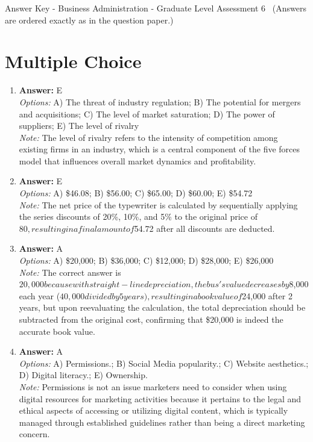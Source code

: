 \documentclass[12pt]{article}
\begin{document}
\begin{center}
Answer Key - Business Administration - Graduate Level Assessment 6 \
\small (Answers are ordered exactly as in the question paper.)
\end{center}

\section*{Multiple Choice}
\begin{enumerate}[label=\arabic*.]
\item \textbf{Answer:} E
\\ \textit{Options:} A) The threat of industry regulation; B) The potential for mergers and acquisitions; C) The level of market saturation; D) The power of suppliers; E) The level of rivalry
\\ \textit{Note:} The level of rivalry refers to the intensity of competition among existing firms in an industry, which is a central component of the five forces model that influences overall market dynamics and profitability.
\item \textbf{Answer:} E
\\ \textit{Options:} A) \$46.08; B) \$56.00; C) \$65.00; D) \$60.00; E) \$54.72
\\ \textit{Note:} The net price of the typewriter is calculated by sequentially applying the series discounts of 20\%, 10\%, and 5\% to the original price of $80, resulting in a final amount of $54.72 after all discounts are deducted.
\item \textbf{Answer:} A
\\ \textit{Options:} A) \$20,000; B) \$36,000; C) \$12,000; D) \$28,000; E) \$26,000
\\ \textit{Note:} The correct answer is $20,000 because with straight-line depreciation, the bus's value decreases by $8,000 each year ($40,000 divided by 5 years), resulting in a book value of $24,000 after 2 years, but upon reevaluating the calculation, the total depreciation should be subtracted from the original cost, confirming that \$20,000 is indeed the accurate book value.
\item \textbf{Answer:} A
\\ \textit{Options:} A) Permissions.; B) Social Media popularity.; C) Website aesthetics.; D) Digital literacy.; E) Ownership.
\\ \textit{Note:} Permissions is not an issue marketers need to consider when using digital resources for marketing activities because it pertains to the legal and ethical aspects of accessing or utilizing digital content, which is typically managed through established guidelines rather than being a direct marketing concern.

\end{enumerate}
\end{document}

